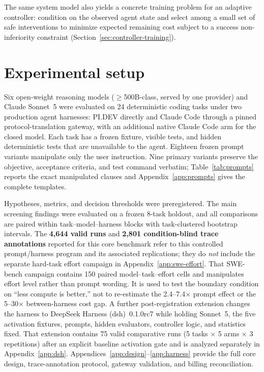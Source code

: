 \documentclass[11pt]{article}
\newcommand{\pidev}{PI.DEV}
\newcommand{\cc}{Claude Code}
\newcommand{\xd}{$\times$}
\begin{document}
The same system model also yields a concrete training problem for an adaptive
controller: condition on the observed agent state and select among a small set
of safe interventions to minimize expected remaining cost subject to a success
non-inferiority constraint (Section~\ref{sec:controller-training}).

\section{Experimental setup}
Six open-weight reasoning models ($\geq$500B-class, served by one provider)
and Claude Sonnet~5 were evaluated on 24 deterministic coding tasks under
two production agent harnesses: \pidev{} directly and \cc{} through a
pinned protocol-translation gateway, with an additional native \cc{} arm
for the closed model. Each task has a frozen fixture, visible tests, and
hidden deterministic tests that are unavailable to the agent. Eighteen
frozen prompt variants manipulate only the user instruction. Nine primary
variants preserve the objective, acceptance criteria, and test command
verbatim; Table~\ref{tab:prompts} reports the exact manipulated clauses and
Appendix~\ref{app:prompts} gives the complete templates.

Hypotheses, metrics, and decision thresholds were preregistered. The main
screening findings were evaluated on a frozen 8-task holdout, and all
comparisons are paired within task--model--harness blocks with
task-clustered bootstrap intervals. The \textbf{4{,}644 valid runs} and
\textbf{2{,}801 condition-blind trace annotations} reported for this core
benchmark refer to this controlled prompt/harness program and its associated
replications; they do \emph{not} include the separate hard-task effort
campaign in Appendix~\ref{app:swe-effort}. That SWE-bench campaign contains
150 paired model--task--effort cells and manipulates effort level rather than
prompt wording. It is used to test the boundary condition on ``less compute is
better,'' not to re-estimate the 2.4--7.4\xd{} prompt effect or the 5--30\xd{}
between-harness cost gap. A further post-registration extension changes the
harness to DeepSeek Harness (dsh)~0.1.0rc7 while holding Sonnet~5, the five
activation fixtures, prompts, hidden evaluators, controller logic, and
statistics fixed. That extension contains 75 valid comparative runs
(5 tasks $\times$ 5 arms $\times$ 3 repetitions) after an explicit baseline
activation gate and is analyzed separately in Appendix~\ref{app:dsh}.
Appendices~\ref{app:design}--\ref{app:harness} provide the full core
design, trace-annotation protocol, gateway validation, and billing
reconciliation.
\end{document}
